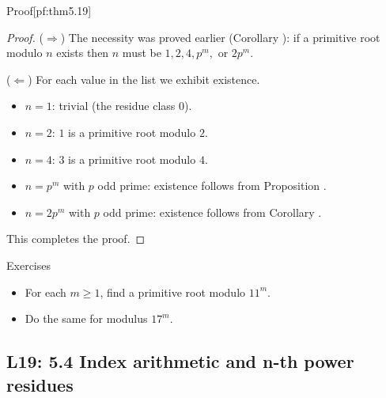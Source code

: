 \documentclass[10pt]{article}
\theoremstyle{definition}
\theoremstyle{plain}
\numberwithin{equation}{section}
\begin{document}
\begin{define}{Proof}[pf:thm5.19]
\begin{proof}
($\Rightarrow$) The necessity was proved earlier (Corollary ): if a primitive root modulo $n$ exists then $n$ must be $1,2,4,p^m,$ or $2p^m$.

($\Leftarrow$) For each value in the list we exhibit existence.
\begin{itemize}
  \item $n=1$: trivial (the residue class $0$).
  \item $n=2$: $1$ is a primitive root modulo $2$.
  \item $n=4$: $3$ is a primitive root modulo $4$.
  \item $n=p^m$ with $p$ odd prime: existence follows from Proposition .
  \item $n=2p^m$ with $p$ odd prime: existence follows from Corollary .
\end{itemize}
This completes the proof.
\end{proof}
\end{define}

\bigskip

\begin{define}{Exercises}
\begin{itemize}
  \item For each $m\ge1$, find a primitive root modulo $11^m$.
  \item Do the same for modulus $17^m$.
\end{itemize}
\end{define}




\newpage
\subsection{L19: 5.4 Index arithmetic and n-th power residues}
\end{document}

